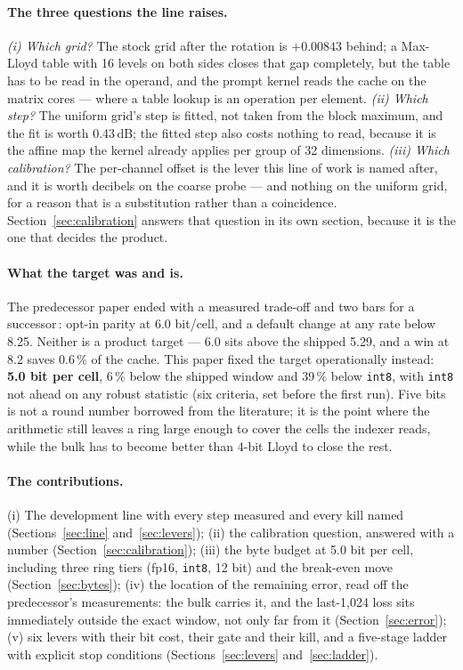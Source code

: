 \documentclass[10pt,twocolumn]{article}
\begin{document}
\paragraph{The three questions the line raises.} \emph{(i) Which grid?} The stock grid after the rotation
is $+0.00843$ behind; a Max-Lloyd table with 16 levels on both sides closes that gap completely, but the
table has to be read in the operand, and the prompt kernel reads the cache on the matrix cores --- where a
table lookup is an operation per element. \emph{(ii) Which step?} The uniform grid's step is fitted, not
taken from the block maximum, and the fit is worth 0.43\,dB; the fitted step also costs nothing to read,
because it is the affine map the kernel already applies per group of 32 dimensions. \emph{(iii) Which
calibration?} The per-channel offset is the lever this line of work is named after, and it is worth decibels
on the coarse probe --- and nothing on the uniform grid, for a reason that is a substitution rather than a
coincidence. Section~\ref{sec:calibration} answers that question in its own section, because it is the one
that decides the product.

\paragraph{What the target was and is.} The predecessor paper ended with a measured trade-off and two bars
for a successor\,\cite{kvwin}: opt-in parity at 6.0 bit/cell, and a default change at any rate below 8.25.
Neither is a product target --- 6.0 sits above the shipped 5.29, and a win at 8.2 saves 0.6\,\% of the
cache. This paper fixed the target operationally instead: \textbf{5.0 bit per cell}, 6\,\% below the
shipped window and 39\,\% below \texttt{int8}, with \texttt{int8} not ahead on any robust statistic (six
criteria, set before the first run). Five bits is not a round number borrowed from the literature; it is the
point where the arithmetic still leaves a ring large enough to cover the cells the indexer reads, while the
bulk has to become better than 4-bit Lloyd to close the rest.

\paragraph{The contributions.} (i) The development line with every step measured and every kill named
(Sections~\ref{sec:line} and~\ref{sec:levers}); (ii) the calibration question, answered with a number
(Section~\ref{sec:calibration}); (iii) the byte budget at 5.0 bit per cell, including three ring tiers
(fp16, \texttt{int8}, 12 bit) and the break-even move (Section~\ref{sec:bytes}); (iv) the location of the
remaining error, read off the predecessor's measurements: the bulk carries it, and the last-1,024 loss sits
immediately outside the exact window, not only far from it (Section~\ref{sec:error}); (v) six levers with
their bit cost, their gate and their kill, and a five-stage ladder with explicit stop conditions
(Sections~\ref{sec:levers} and~\ref{sec:ladder}).
\end{document}
